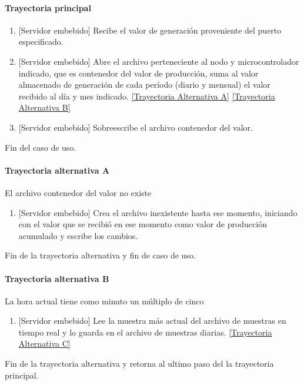 \begin{longtable}{|J{5cm}|J{10.3cm}|}
\end{longtable}

\paragraph{Trayectoria principal}
\label{SUB-M-CU1.9:TP}
	\begin{enumerate}
		\item {[Servidor embebido]} Recibe el valor de generación proveniente del puerto especificado.
		
		\item {[Servidor embebido]} Abre el archivo perteneciente al nodo y microcontrolador indicado, que es contenedor del valor de producción, suma al valor almacenado de generación de cada período (diario y mensual) el valor recibido al día y mes indicado.
		\hyperref[SUB-M-CU1.4:TA]{[Trayectoria Alternativa A]}
		\hyperref[SUB-M-CU1.4:TB]{[Trayectoria Alternativa B]}
		
		\item {[Servidor embebido]}  Sobreescribe el archivo contenedor del valor.
	
	\end{enumerate}
	Fin del caso de uso.

\paragraph{Trayectoria alternativa A} \label{SUB-M-CU1.9:TA}
	El archivo contenedor del valor no existe
	\begin{enumerate}[label=A\arabic*.]
		\item {[Servidor embebido]} Crea el archivo inexistente hasta ese momento, iniciando con el valor que se recibió en ese momento como valor de producción acumulado y escribe los cambios.
	\end{enumerate}
	Fin de la trayectoria alternativa y fin de caso de uso.


\paragraph{Trayectoria alternativa B} \label{SUB-M-CU1.9:TB}
	La hora actual tiene como minuto un múltiplo de cinco
	\begin{enumerate}[label=B\arabic*.]
		\item {[Servidor embebido]} Lee la muestra más actual del archivo de muestras en tiempo real y lo guarda en el archivo de muestras diarias.
		\hyperref[SUB-M-CU1.4:TC]{[Trayectoria Alternativa C]}
	\end{enumerate}
	Fin de la trayectoria alternativa y retorna al ultimo paso del la trayectoria principal.
	
